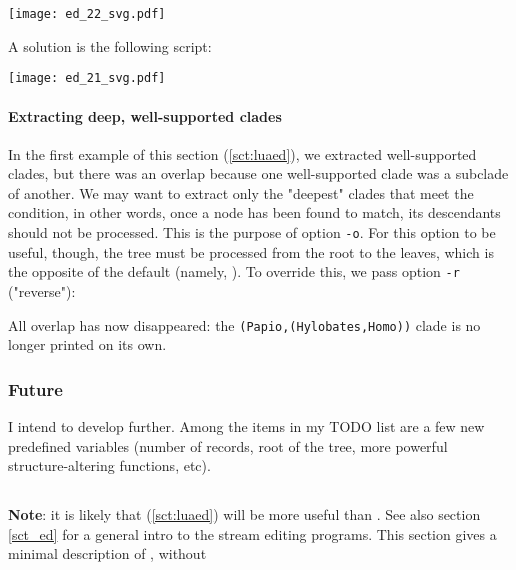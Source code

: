 
\begin{center}
\texttt{[image: ed\_22\_svg.pdf]}
\end{center}

A solution is the following \luaed{} script:





\begin{center}
\texttt{[image: ed\_21\_svg.pdf]}
\end{center} 

\paragraph{Extracting deep, well-supported clades}

In the first example of this section (\ref{sct:luaed}), we extracted
well-supported clades, but there was an overlap because one well-supported clade
was a subclade of another. We may want to extract only the "deepest" clades that
meet the condition, in other words, once a node has been found to match, its
descendants should not be processed. This is the purpose of option \texttt{-o}.
For this option to be useful, though, the tree must be processed from the root
to the leaves, which is the opposite of the default (namely, \no). To override
this, we pass option \texttt{-r} ("reverse"):


\begin{samepage}

\end{samepage}

\noindent{}All overlap has now disappeared: the
\texttt{(Papio,(Hylobates,Homo))} clade is no longer printed on its own. 

\subsubsection{Future}

I intend to develop \luaed{} further. Among the items in my TODO list are a few
new predefined variables (number of records, root of the tree, more powerful
structure-altering functions, etc).

\subsection{\ed}

\textbf{Note}: it is likely that \luaed{} (\ref{sct:luaed}) will be more useful
than \ed. See also section \ref{sct_ed} for a general intro to the stream
editing programs. This section gives a minimal description of \ed, without

